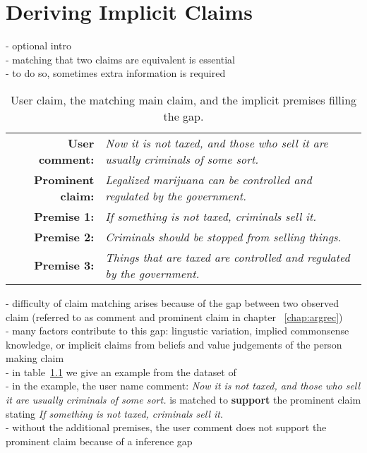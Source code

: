\chapter{Deriving Implicit Claims}
\label{chap:deriving_implicit}

- optional intro \\
- matching that two claims are equivalent is essential \\
- to do so, sometimes extra information is required \\

\begin{table}
{\normalsize
\begin{tabular}{|@{\ }r@{\ \  }p{}|}
\hline
\textbf{User comment:} & \emph{Now it is not taxed, and those who sell it are usually criminals of some sort.}\\
\textbf{Prominent claim:} & \emph{Legalized marijuana can be controlled and regulated by the government.}\\
\textbf{Premise 1:} & \emph{If something is not taxed, criminals sell it.}\\
\textbf{Premise 2:} & \emph{Criminals should be stopped from selling things.}\\
\textbf{Premise 3:} & \emph{Things that are taxed are controlled and regulated by the government.}\\
\hline
\end{tabular}}
\caption{User claim, the matching main claim, and the implicit premises filling the gap.}
\label{tab:premise_example}
\end{table}

\noindent - difficulty of claim matching arises because of the gap between 
two observed claim (referred to as comment and prominent claim in 
chapter ~\ref{chap:argrec}) \\
- many factors contribute to this gap: lingustic variation, 
implied commonsense knowledge, or implicit claims from beliefs and value
judgements of the person making claim \\
- in table~\ref{tab:premise_example} we give an example from 
the dataset of \citet{hasan2014you} \\
- in the example, the user name comment: 
\emph{Now it is not taxed, and those who sell it are usually criminals of some sort.}
is matched to \textbf{support} the prominent claim stating
\emph{If something is not taxed, criminals sell it}.\\
- without the additional premises, the user comment does not support the prominent 
claim because of a inference gap\\

